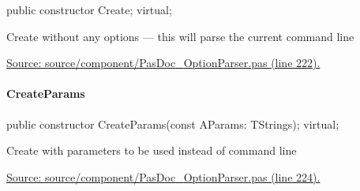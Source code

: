 \documentclass{report}
\newif\ifpdf
\begin{document}
\label{PasDoc_OptionParser.TOptionParser-Create}
\begin{list}{}{
\setlength{\itemindent}{0cm}
\setlength{\listparindent}{0cm}
\setlength{\leftmargin}{\evensidemargin}
\addtolength{\leftmargin}{\tmplength}
\settowidth{\labelsep}{X}
\addtolength{\leftmargin}{\labelsep}
\setlength{\labelwidth}{\tmplength}
}
\item[\textbf{Declaration}\hfill]
\ifpdf
\begin{flushleft}
\fi
\begin{ttfamily}
public constructor Create; virtual;\end{ttfamily}

\ifpdf
\end{flushleft}
\fi

\par
\item[\textbf{Description}]
Create without any options --- this will parse the current command line\par
\href{https://github.com/pasdoc/pasdoc/blob/master/source/component/PasDoc_OptionParser.pas#L222}{Source: source/component/PasDoc{\_}OptionParser.pas (line 222).}

\end{list}
\paragraph*{CreateParams}\hspace*{\fill}

\label{PasDoc_OptionParser.TOptionParser-CreateParams}
\begin{list}{}{
\setlength{\itemindent}{0cm}
\setlength{\listparindent}{0cm}
\setlength{\leftmargin}{\evensidemargin}
\addtolength{\leftmargin}{\tmplength}
\settowidth{\labelsep}{X}
\addtolength{\leftmargin}{\labelsep}
\setlength{\labelwidth}{\tmplength}
}
\item[\textbf{Declaration}\hfill]
\ifpdf
\begin{flushleft}
\fi
\begin{ttfamily}
public constructor CreateParams(const AParams: TStrings); virtual;\end{ttfamily}

\ifpdf
\end{flushleft}
\fi

\par
\item[\textbf{Description}]
Create with parameters to be used instead of command line\par
\href{https://github.com/pasdoc/pasdoc/blob/master/source/component/PasDoc_OptionParser.pas#L224}{Source: source/component/PasDoc{\_}OptionParser.pas (line 224).}

\end{list}
\end{document}
